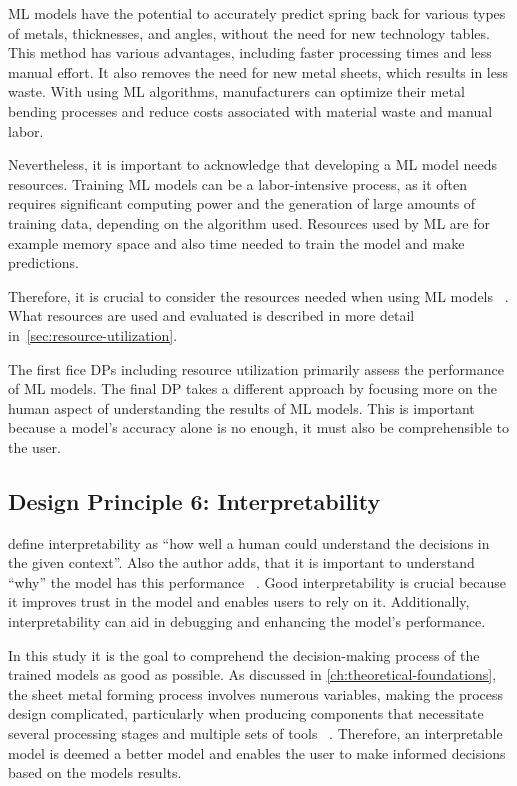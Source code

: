 ML models have the potential to accurately predict spring back for various types of metals,
thicknesses, and angles, without the need for new technology tables.
This method has various advantages, including faster processing times and less manual effort.
It also removes the need for new metal sheets, which results in less waste.
With using \ac{ML} algorithms, manufacturers can optimize
their metal bending processes and reduce costs associated with material waste and manual labor.

Nevertheless, it is important to acknowledge that developing a \ac{ML} model needs resources.
Training \ac{ML} models can be a labor-intensive process, as it often requires significant
computing power and the generation of large amounts of training data, depending on the algorithm used.
Resources used by \ac{ML} are for example memory space and also time needed to train the model and make predictions.

Therefore, it is crucial to consider the resources needed when using \ac{ML} models
~\cite[p. 16]{siebert2022construction}.
What resources are used and evaluated is described in more detail in~\cref{sec:resource-utilization}.

The first fice \ac{DP}s including resource utilization primarily assess the performance of \ac{ML} models.
The final \ac{DP} takes a different approach by focusing more on the human aspect of understanding the results of
\ac{ML} models.
This is important because a model's accuracy alone is no enough, it must also be comprehensible to the user.


\subsection*{Design Principle 6: Interpretability}
\cite{miller2019explanation} define interpretability as ``how well a human could understand the decisions in the
given context''.
Also the author adds, that it is important to understand ``why'' the model has this performance
~\cite[p. 1]{miller2019explanation}.
Good interpretability is crucial because it improves trust in the model and enables users to rely on it.
Additionally, interpretability can aid in debugging and enhancing the model's performance.

In this study it is the goal to comprehend the decision-making process of the trained models as good as possible.
As discussed in \cref{ch:theoretical-foundations}, the sheet metal forming process involves numerous
variables, making the process design complicated, particularly when producing components that necessitate several
processing stages and multiple sets of tools
~\cite[p. 1]{dib2020single}.
Therefore, an interpretable model is deemed a better model and enables the user to make informed decisions based
on the models results.


